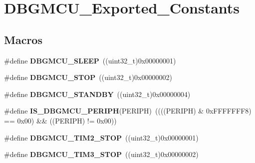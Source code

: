 \hypertarget{group___d_b_g_m_c_u___exported___constants}{}\section{D\+B\+G\+M\+C\+U\+\_\+\+Exported\+\_\+\+Constants}
\label{group___d_b_g_m_c_u___exported___constants}
\subsection*{Macros}
\begin{DoxyCompactItemize}
\item 
\hypertarget{group___d_b_g_m_c_u___exported___constants_ga1c457289646b9d9814b93fbb994c9930}{}\#define {\bfseries D\+B\+G\+M\+C\+U\+\_\+\+S\+L\+E\+E\+P}~((uint32\+\_\+t)0x00000001)\label{group___d_b_g_m_c_u___exported___constants_ga1c457289646b9d9814b93fbb994c9930}

\item 
\hypertarget{group___d_b_g_m_c_u___exported___constants_ga4a71bcfa6868672674b5410d2fd372f4}{}\#define {\bfseries D\+B\+G\+M\+C\+U\+\_\+\+S\+T\+O\+P}~((uint32\+\_\+t)0x00000002)\label{group___d_b_g_m_c_u___exported___constants_ga4a71bcfa6868672674b5410d2fd372f4}

\item 
\hypertarget{group___d_b_g_m_c_u___exported___constants_ga6eb848845f9207ffdccd0590da192002}{}\#define {\bfseries D\+B\+G\+M\+C\+U\+\_\+\+S\+T\+A\+N\+D\+B\+Y}~((uint32\+\_\+t)0x00000004)\label{group___d_b_g_m_c_u___exported___constants_ga6eb848845f9207ffdccd0590da192002}

\item 
\hypertarget{group___d_b_g_m_c_u___exported___constants_ga96d44dc7861b6a3f364942704f323a45}{}\#define {\bfseries I\+S\+\_\+\+D\+B\+G\+M\+C\+U\+\_\+\+P\+E\+R\+I\+P\+H}(P\+E\+R\+I\+P\+H)~((((P\+E\+R\+I\+P\+H) \& 0x\+F\+F\+F\+F\+F\+F\+F8) == 0x00) \&\& ((\+P\+E\+R\+I\+P\+H) != 0x00))\label{group___d_b_g_m_c_u___exported___constants_ga96d44dc7861b6a3f364942704f323a45}

\item 
\hypertarget{group___d_b_g_m_c_u___exported___constants_ga8ba3a77260f748793c903468a4608bd1}{}\#define {\bfseries D\+B\+G\+M\+C\+U\+\_\+\+T\+I\+M2\+\_\+\+S\+T\+O\+P}~((uint32\+\_\+t)0x00000001)\label{group___d_b_g_m_c_u___exported___constants_ga8ba3a77260f748793c903468a4608bd1}

\item 
\hypertarget{group___d_b_g_m_c_u___exported___constants_ga28c01c2c30bed78e51d997007986fac9}{}\#define {\bfseries D\+B\+G\+M\+C\+U\+\_\+\+T\+I\+M3\+\_\+\+S\+T\+O\+P}~((uint32\+\_\+t)0x00000002)\label{group___d_b_g_m_c_u___exported___constants_ga28c01c2c30bed78e51d997007986fac9}


\end{DoxyCompactItemize}
